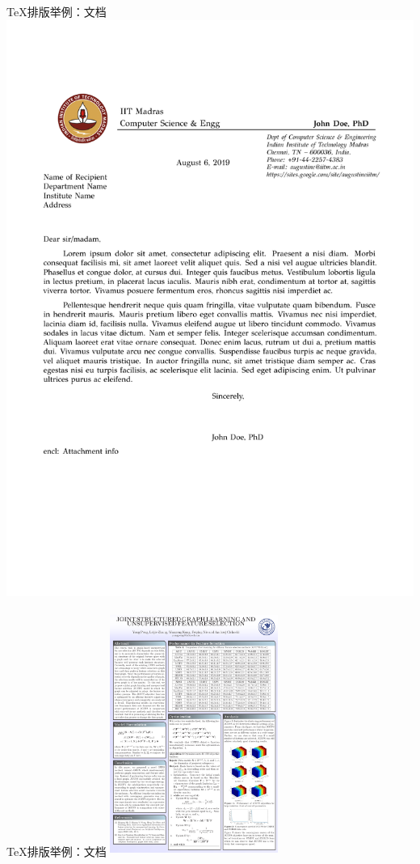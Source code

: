 \documentclass[UTF8,11pt]{beamer}
\begin{document}
\begin{frame}{\TeX 排版举例：文档}
	\includegraphics[scale=0.25]{figure/letter}
\end{frame}


\begin{frame}{\TeX 排版举例：文档}
	\centering
	\includegraphics[width=5.5cm,height=8cm]{figure/poster}
\end{frame}
\end{document}
